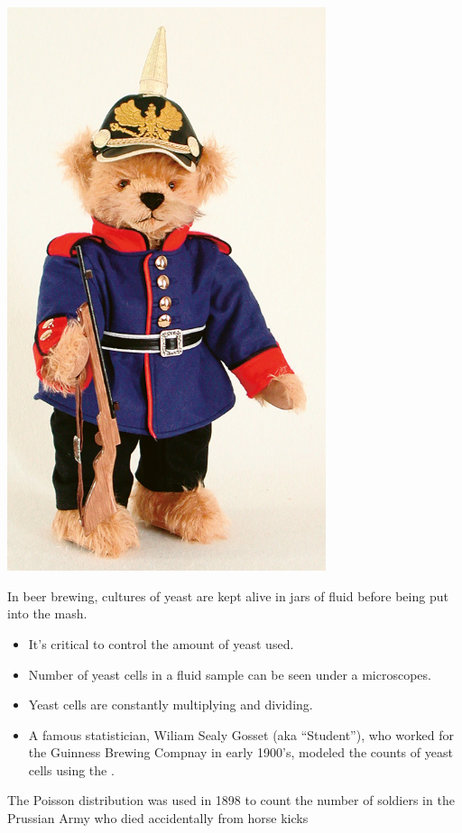 \documentclass[slidestop,compress,mathserif]{beamer}
\begin{document}
\begin{frame}
{\begin{center}
\includegraphics[width = 0.7\textwidth]{figures/prussian_soldier}
\end{center}

}
{
In beer brewing, cultures of yeast are kept alive in jars of fluid before being put into the mash.
\begin{itemize}
\item It's critical to control the amount of yeast used. %
\item Number of yeast cells in a fluid sample can be seen under a microscopes.
\item Yeast cells are constantly multiplying and dividing.
\item A famous statistician, Wiliam Sealy Gosset (aka ``Student''), who worked
for the Guinness Brewing Compnay in early 1900's, modeled
the counts of yeast cells using the .
\end{itemize}


\vspace{24pt}
The Poisson distribution was used in 1898 to count the number of
soldiers in the Prussian Army
who died accidentally from horse kicks


}

\end{frame}
\end{document}
